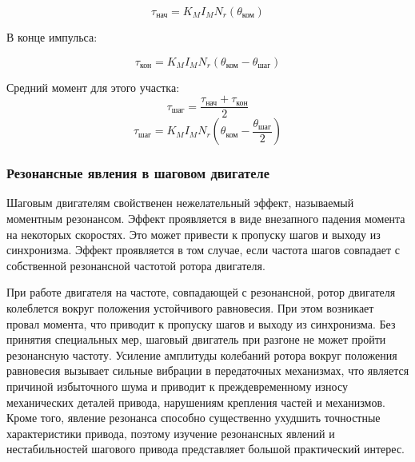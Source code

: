 \begin{equation}
    \label{moment_to_rotor_at_the_begin_of_control_pulse}
    \tau_{\textit{нач}} = K_{M} I_{M} N_{r} ( \theta_{\textit{ком}} )
\end{equation}

В конце импульса:

\begin{equation}
    \label{moment_to_rotor_at_the_end_of_control_pulse}
    \tau_{\textit{кон}} = K_{M} I_{M} N_{r} ( \theta_{\textit{ком}} - \theta_{\textit{шаг}} )
\end{equation}

Средний момент для этого участка:
$$
    \tau_{\textit{шаг}} = \frac{ \tau_{\textit{нач}} + \tau_{\textit{кон}} }{ 2 }
$$
$$
    \tau_{\textit{шаг}} = K_{M} I_{M} N_{r} ( \theta_{\textit{ком}} - \frac{ \theta_{\textit{шаг}} }{ 2 } )
$$

\subsubsection{Резонансные явления в шаговом двигателе}
Шаговым двигателям свойственен нежелательный эффект, называемый моментным резонансом. Эффект
проявляется в виде внезапного падения момента на некоторых скоростях. Это может привести к пропуску
шагов и выходу из синхронизма. Эффект проявляется в том случае, если частота шагов совпадает с
собственной резонансной частотой ротора двигателя.

При работе двигателя на частоте, совпадающей с резонансной, ротор двигателя колеблется вокруг
положения устойчивого равновесия. При этом возникает провал момента, что приводит к пропуску шагов и
выходу из синхронизма. Без принятия специальных мер, шаговый двигатель при разгоне не может пройти резонансную
частоту. Усиление амплитуды колебаний ротора вокруг положения равновесия вызывает сильные вибрации в
передаточных механизмах, что является причиной избыточного шума и приводит к преждевременному износу
механических деталей привода, нарушениям крепления частей и механизмов. Кроме того,
явление резонанса способно существенно ухудшить точностные характеристики привода, поэтому изучение
резонансных явлений и нестабильностей шагового привода представляет большой практический интерес.

